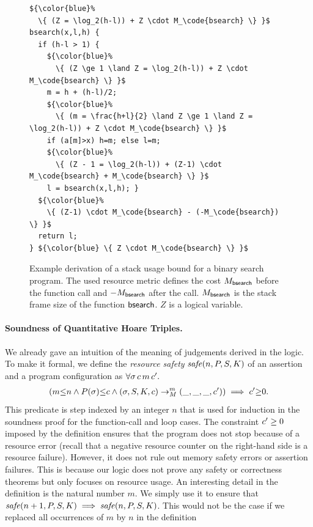 \documentclass[nocopyrightspace,preprint]{sigplanconf}
\newcommand{\iffull}[2]{\ifx\fullversion\undefined{#2}\else{#1}\fi}
\begin{document}
\begin{figure}
\begin{lstlisting}
${\color{blue}%
  \{ (Z = \log_2(h-l)) + Z \cdot M_\code{bsearch} \} }$
bsearch(x,l,h) {
  if (h-l > 1) {
    ${\color{blue}%
      \{ (Z \ge 1 \land Z = \log_2(h-l)) + Z \cdot M_\code{bsearch} \} }$
    m = h + (h-l)/2;
    ${\color{blue}%
      \{ (m = \frac{h+l}{2} \land Z \ge 1 \land Z = \log_2(h-l)) + Z \cdot M_\code{bsearch} \} }$
    if (a[m]>x) h=m; else l=m;
    ${\color{blue}%
      \{ (Z - 1 = \log_2(h-l)) + (Z-1) \cdot M_\code{bsearch} + M_\code{bsearch} \} }$
    l = bsearch(x,l,h); }
  ${\color{blue}%
    \{ (Z-1) \cdot M_\code{bsearch} - (-M_\code{bsearch}) \} }$
  return l;
} ${\color{blue} \{ Z \cdot M_\code{bsearch} \} }$
\end{lstlisting}
\caption{Example derivation of a stack usage bound for a binary
  search program.  The used resource metric defines the cost $M_{\mathsf{bsearch}}$ before
  the function call and $-M_{\mathsf{bsearch}}$ after the call.  $M_{\mathsf{bsearch}}$ is the stack
  frame size of the function $\mathsf{bsearch}$.  $Z$ is a
  logical variable.
  }
\label{fig:xmplbs}
\end{figure}


\paragraph{Soundness of Quantitative Hoare Triples.}

We already gave an intuition of the meaning of judgements
derived in the logic.  To make it formal, we define the
\emph{resource safety} $\mathit{safe}(n,P,S,K)$ of an assertion
and a program configuration as $\forall \sigma \, c \, m \, c' .$
\begin{align*}
  (m {\le} n \land P(\sigma) {\le} c \land
    (\sigma, S, K, c) \to_{M}^m (\_, \_, \_, c'))
  \implies c' {\ge} 0.
\end{align*}
This predicate is step indexed by an integer $n$ that is used for
induction in the soundness proof for the function-call and loop cases.
The constraint $c' \geq 0$ imposed by the definition ensures that
the program does not stop because of a resource error (recall that a
negative resource counter on the right-hand side is a resource
failure).  However, it does not rule out memory safety errors or
assertion failures. This is because our logic does not prove any
safety or correctness theorems but only focuses on resource usage.
%
An interesting detail in the definition is the natural number $m$.  We
simply use it to ensure that $\mathit{safe}(n+1,P,S,K) \implies \mathit{safe}(n,P,S,K) $.  This would not be the case if we replaced all occurrences of
$m$ by $n$ in the definition\iffull{ of validity.}{.}
\end{document}
